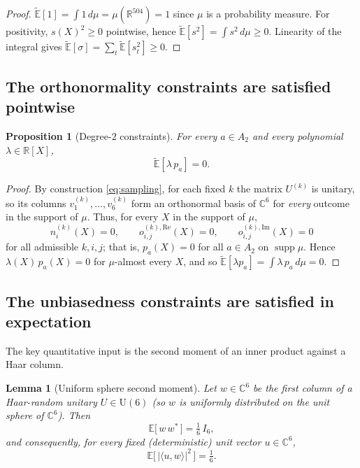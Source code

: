 \documentclass{amsart}
\newtheorem{lemma}{Lemma}
\newtheorem{proposition}{Proposition}
\theoremstyle{definition}
\theoremstyle{remark}
\begin{document}
\begin{proof}
$\widetilde{\mathbb{E}}[1]=\int 1\,d\mu=\mu(\mathbb{R}^{504})=1$ since $\mu$ is a probability
measure. For positivity, $s(X)^2\ge0$ pointwise, hence
$\widetilde{\mathbb{E}}[s^2]=\int s^2\,d\mu\ge0$. Linearity of the integral gives
$\widetilde{\mathbb{E}}[\sigma]=\sum_t\widetilde{\mathbb{E}}[s_t^2]\ge0$. \qedhere
\end{proof}

\subsection{The orthonormality constraints are satisfied pointwise}

\begin{proposition}[Degree-$2$ constraints]\label{prop:deg2}
For every $a\in A_2$ and every polynomial $\lambda\in\mathbb{R}[X]$,
\[
\widetilde{\mathbb{E}}[\lambda\,p_a]=0 .
\]
\end{proposition}

\begin{proof}
By construction \eqref{eq:sampling}, for each fixed $k$ the matrix $U^{(k)}$ is unitary, so its
columns $v^{(k)}_1,\dots,v^{(k)}_6$ form an orthonormal basis of $\mathbb{C}^6$ for
\emph{every} outcome in the support of $\mu$. Thus, for every $X$ in the support of $\mu$,
\[
n^{(k)}_i(X)=0,\qquad o^{(k),\mathrm{Re}}_{i,j}(X)=0,\qquad o^{(k),\mathrm{Im}}_{i,j}(X)=0
\]
for all admissible $k,i,j$; that is, $p_a(X)=0$ for all $a\in A_2$ on $\operatorname{supp}\mu$.
Hence $\lambda(X)\,p_a(X)=0$ for $\mu$-almost every $X$, and so
$\widetilde{\mathbb{E}}[\lambda p_a]=\int \lambda\,p_a\,d\mu=0$. \qedhere
\end{proof}

\subsection{The unbiasedness constraints are satisfied in expectation}

The key quantitative input is the second moment of an inner product against a Haar column.

\begin{lemma}[Uniform sphere second moment]\label{lem:sphere}
Let $w\in\mathbb{C}^6$ be the first column of a Haar-random unitary $U\in\mathrm{U}(6)$ (so $w$
is uniformly distributed on the unit sphere of $\mathbb{C}^6$). Then
\[
\mathbb{E}\bigl[\,w\,w^{*}\,\bigr]=\tfrac16\,I_6 ,
\]
and consequently, for every fixed (deterministic) unit vector $u\in\mathbb{C}^6$,
\[
\mathbb{E}\bigl[\,|\langle u,w\rangle|^2\,\bigr]=\tfrac16 .
\]
\end{lemma}
\end{document}
